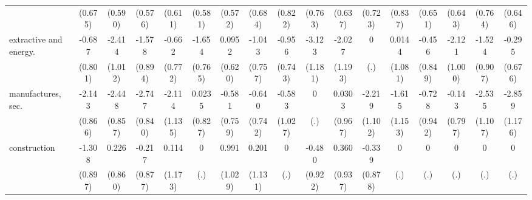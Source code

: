 {\begin{tabular}{l*{16}{c}}
                    &     (0.675)         &     (0.590)         &     (0.576)         &     (0.611)         &     (0.581)         &     (0.572)         &     (0.684)         &     (0.822)         &     (0.763)         &     (0.637)         &     (0.723)         &     (0.837)         &     (0.651)         &     (0.643)         &     (0.764)         &     (0.646)         \\
[1em]
extractive and energy.&      -0.687         &      -2.414\sym{*}  &      -1.578         &      -0.662         &      -1.654\sym{*}  &      0.0952         &      -1.043         &      -0.956         &      -3.123\sym{**} &      -2.027         &           0         &      0.0144         &      -0.456         &      -2.121\sym{*}  &      -1.524         &      -0.295         \\
                    &     (0.801)         &     (1.012)         &     (0.894)         &     (0.772)         &     (0.765)         &     (0.620)         &     (0.757)         &     (0.743)         &     (1.181)         &     (1.193)         &         (.)         &     (1.081)         &     (0.849)         &     (1.000)         &     (0.907)         &     (0.676)         \\
[1em]
manufactures, sec.  &      -2.143\sym{*}  &      -2.448\sym{**} &      -2.747\sym{**} &      -2.114         &      0.0235         &      -0.581         &      -0.640         &      -0.583         &           0         &      0.0303         &      -2.219\sym{*}  &      -1.615         &      -0.728         &      -0.143         &      -2.535\sym{*}  &      -2.859\sym{*}  \\
                    &     (0.866)         &     (0.857)         &     (0.840)         &     (1.135)         &     (0.827)         &     (0.759)         &     (0.742)         &     (1.027)         &         (.)         &     (0.967)         &     (1.102)         &     (1.153)         &     (0.942)         &     (0.797)         &     (1.107)         &     (1.176)         \\
[1em]
construction        &      -1.308         &       0.226         &      -0.217         &       0.114         &           0         &       0.991         &       0.201         &           0         &      -0.480         &       0.360         &      -0.339         &           0         &           0         &           0         &           0         &           0         \\
                    &     (0.897)         &     (0.860)         &     (0.877)         &     (1.173)         &         (.)         &     (1.029)         &     (1.131)         &         (.)         &     (0.922)         &     (0.937)         &     (0.878)         &         (.)         &         (.)         &         (.)         &         (.)         &         (.)         \\

\end{tabular}}

